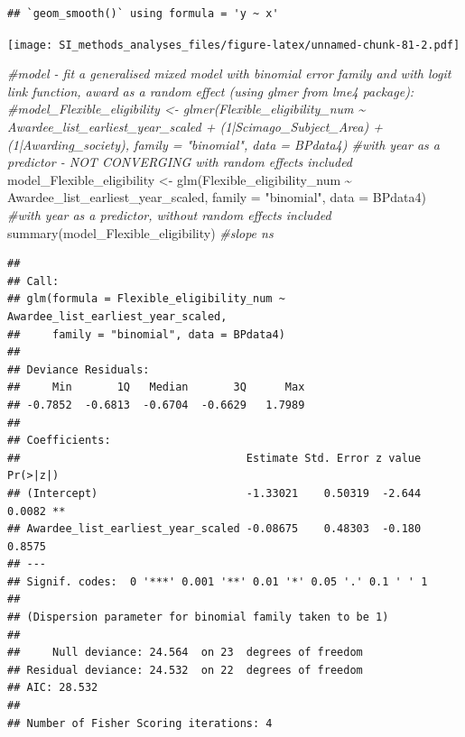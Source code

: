 \documentclass[
]{article}
\newenvironment{Shaded}{\begin{snugshade}}{\end{snugshade}}
\newcommand{\AttributeTok}[1]{\textcolor[rgb]{0.77,0.63,0.00}{#1}}
\newcommand{\CommentTok}[1]{\textcolor[rgb]{0.56,0.35,0.01}{\textit{#1}}}
\newcommand{\DocumentationTok}[1]{\textcolor[rgb]{0.56,0.35,0.01}{\textbf{\textit{#1}}}}
\newcommand{\FunctionTok}[1]{\textcolor[rgb]{0.00,0.00,0.00}{#1}}
\newcommand{\NormalTok}[1]{#1}
\newcommand{\OtherTok}[1]{\textcolor[rgb]{0.56,0.35,0.01}{#1}}
\newcommand{\SpecialCharTok}[1]{\textcolor[rgb]{0.00,0.00,0.00}{#1}}
\newcommand{\StringTok}[1]{\textcolor[rgb]{0.31,0.60,0.02}{#1}}
\begin{document}
\begin{verbatim}
## `geom_smooth()` using formula = 'y ~ x'
\end{verbatim}

\texttt{[image: SI\_methods\_analyses\_files/figure-latex/unnamed-chunk-81-2.pdf]}

\begin{Shaded}
\begin{Highlighting}[]
\CommentTok{\#model {-} fit a generalised mixed model with binomial error family and with logit link function, award as a random effect (using glmer from lme4 package):}
\CommentTok{\#model\_Flexible\_eligibility \textless{}{-} glmer(Flexible\_eligibility\_num \textasciitilde{} Awardee\_list\_earliest\_year\_scaled + (1|Scimago\_Subject\_Area) + (1|Awarding\_society), family = "binomial", data = BPdata4) \#with year as a predictor {-} NOT CONVERGING with random effects included}
\NormalTok{model\_Flexible\_eligibility }\OtherTok{\textless{}{-}} \FunctionTok{glm}\NormalTok{(Flexible\_eligibility\_num }\SpecialCharTok{\textasciitilde{}}\NormalTok{ Awardee\_list\_earliest\_year\_scaled, }\AttributeTok{family =} \StringTok{"binomial"}\NormalTok{, }\AttributeTok{data =}\NormalTok{ BPdata4) }\CommentTok{\#with year as a predictor, without random effects included}
\FunctionTok{summary}\NormalTok{(model\_Flexible\_eligibility) }\CommentTok{\#slope ns}
\end{Highlighting}
\end{Shaded}

\begin{verbatim}
## 
## Call:
## glm(formula = Flexible_eligibility_num ~ Awardee_list_earliest_year_scaled, 
##     family = "binomial", data = BPdata4)
## 
## Deviance Residuals: 
##     Min       1Q   Median       3Q      Max  
## -0.7852  -0.6813  -0.6704  -0.6629   1.7989  
## 
## Coefficients:
##                                   Estimate Std. Error z value Pr(>|z|)   
## (Intercept)                       -1.33021    0.50319  -2.644   0.0082 **
## Awardee_list_earliest_year_scaled -0.08675    0.48303  -0.180   0.8575   
## ---
## Signif. codes:  0 '***' 0.001 '**' 0.01 '*' 0.05 '.' 0.1 ' ' 1
## 
## (Dispersion parameter for binomial family taken to be 1)
## 
##     Null deviance: 24.564  on 23  degrees of freedom
## Residual deviance: 24.532  on 22  degrees of freedom
## AIC: 28.532
## 
## Number of Fisher Scoring iterations: 4
\end{verbatim}

\begin{Shaded}
\end{Shaded}
\end{document}
